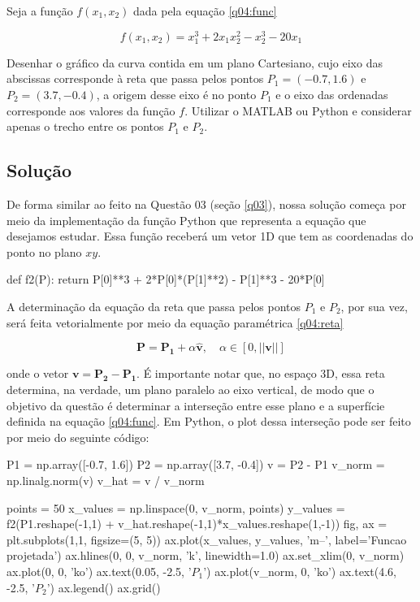 \documentclass[10pt, a4paper]{article}
\begin{document}
Seja a função $f(x_1, x_2)$ dada pela equação \cref{q04:func}

\begin{equation}\label{q04:func}
    f(x_1, x_2) = x_1^3 + 2x_1 x_2^2 - x_2^3 - 20x_1
\end{equation}

Desenhar o gráfico da curva contida em um plano Cartesiano, 
cujo eixo das abscissas corresponde à reta que passa pelos pontos 
$P_1 = (-0.7, 1.6)$ e $P_2 = (3.7,-0.4)$, a origem desse eixo é no 
ponto $P_1$ e o eixo das ordenadas corresponde aos valores da função $f$. 
Utilizar o MATLAB ou Python e considerar apenas o trecho entre os pontos 
$P_1$ e $P_2$.

\subsection{Solução}

De forma similar ao feito na Questão 03 (seção \ref{q03}), nossa solução começa por meio da
implementação da função Python que representa a equação que desejamos estudar. Essa função receberá
um vetor 1D que tem as coordenadas do ponto no plano $xy$.

\begin{python}
def f2(P):
    return P[0]**3 + 2*P[0]*(P[1]**2) - P[1]**3 - 20*P[0]
\end{python}

A determinação da equação da reta que passa pelos pontos $P_1$ e $P_2$, por sua vez, será feita
vetorialmente por meio da equação paramétrica \cref{q04:reta}

\begin{equation}\label{q04:reta}
  \mathbf{P} = \mathbf{P_1} + \alpha\mathbf{\hat{v}}, \quad \alpha \in \left[0, ||\mathbf{v}||\right]
\end{equation}

onde o vetor $\mathbf{v} = \mathbf{P_2} - \mathbf{P_1}$. É importante notar que, 
no espaço 3D, essa reta determina, na verdade, um plano paralelo ao eixo vertical,
de modo que o objetivo da questão é determinar a interseção entre esse plano e a superfície
definida na equação \cref{q04:func}. Em Python, o plot dessa interseção pode ser feito por meio do seguinte código:

\begin{python}
P1 = np.array([-0.7, 1.6])
P2 = np.array([3.7, -0.4])
v = P2 - P1
v_norm = np.linalg.norm(v)
v_hat  = v / v_norm

points = 50
x_values = np.linspace(0, v_norm, points)
y_values = f2(P1.reshape(-1,1) + v_hat.reshape(-1,1)*x_values.reshape(1,-1))
fig, ax = plt.subplots(1,1, figsize=(5, 5))
ax.plot(x_values, y_values, 'm--', label='Funcao projetada')
ax.hlines(0, 0, v_norm, 'k', linewidth=1.0)
ax.set_xlim(0, v_norm)
ax.plot(0, 0, 'ko')
ax.text(0.05, -2.5, '$P_1$')
ax.plot(v_norm, 0, 'ko')
ax.text(4.6, -2.5, '$P_2$')
ax.legend()
ax.grid()
\end{python}
\end{document}
